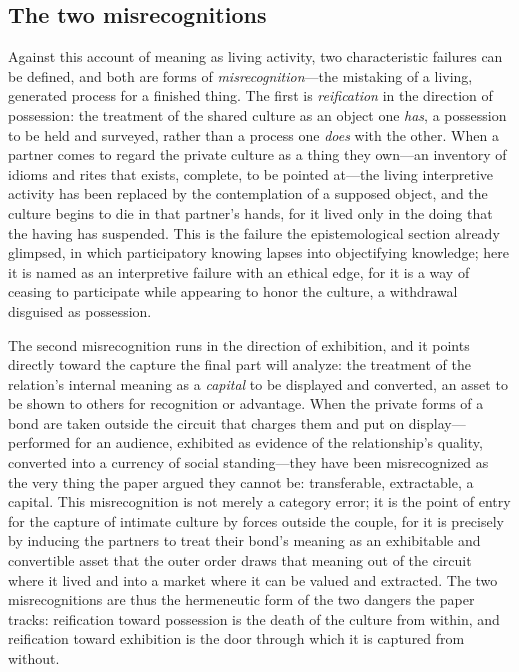 \subsection*{The two misrecognitions}

Against this account of meaning as living activity, two characteristic failures can be defined, and both are forms of \emph{misrecognition}---the mistaking of a living, generated process for a finished thing. The first is \emph{reification} in the direction of possession: the treatment of the shared culture as an object one \emph{has}, a possession to be held and surveyed, rather than a process one \emph{does} with the other. When a partner comes to regard the private culture as a thing they own---an inventory of idioms and rites that exists, complete, to be pointed at---the living interpretive activity has been replaced by the contemplation of a supposed object, and the culture begins to die in that partner's hands, for it lived only in the doing that the having has suspended. This is the failure the epistemological section already glimpsed, in which participatory knowing lapses into objectifying knowledge; here it is named as an interpretive failure with an ethical edge, for it is a way of ceasing to participate while appearing to honor the culture, a withdrawal disguised as possession.

The second misrecognition runs in the direction of exhibition, and it points directly toward the capture the final part will analyze: the treatment of the relation's internal meaning as a \emph{capital} to be displayed and converted, an asset to be shown to others for recognition or advantage. When the private forms of a bond are taken outside the circuit that charges them and put on display---performed for an audience, exhibited as evidence of the relationship's quality, converted into a currency of social standing---they have been misrecognized as the very thing the paper argued they cannot be: transferable, extractable, a capital. This misrecognition is not merely a category error; it is the point of entry for the capture of intimate culture by forces outside the couple, for it is precisely by inducing the partners to treat their bond's meaning as an exhibitable and convertible asset that the outer order draws that meaning out of the circuit where it lived and into a market where it can be valued and extracted. The two misrecognitions are thus the hermeneutic form of the two dangers the paper tracks: reification toward possession is the death of the culture from within, and reification toward exhibition is the door through which it is captured from without.


